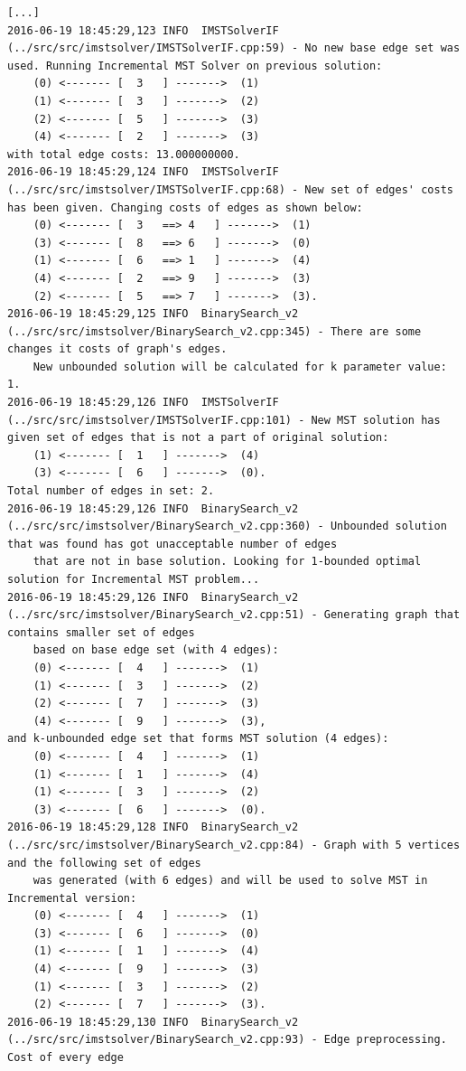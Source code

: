 \begin{verbatim}
[...]
2016-06-19 18:45:29,123 INFO  IMSTSolverIF (../src/src/imstsolver/IMSTSolverIF.cpp:59) - No new base edge set was used. Running Incremental MST Solver on previous solution:
	(0)	<------- [	3	] ------->	(1)
	(1)	<------- [	3	] ------->	(2)
	(2)	<------- [	5	] ------->	(3)
	(4)	<------- [	2	] ------->	(3)
with total edge costs: 13.000000000.
2016-06-19 18:45:29,124 INFO  IMSTSolverIF (../src/src/imstsolver/IMSTSolverIF.cpp:68) - New set of edges' costs has been given. Changing costs of edges as shown below:
	(0)	<------- [	3	==>	4	] ------->	(1)
	(3)	<------- [	8	==>	6	] ------->	(0)
	(1)	<------- [	6	==>	1	] ------->	(4)
	(4)	<------- [	2	==>	9	] ------->	(3)
	(2)	<------- [	5	==>	7	] ------->	(3).
2016-06-19 18:45:29,125 INFO  BinarySearch_v2 (../src/src/imstsolver/BinarySearch_v2.cpp:345) - There are some changes it costs of graph's edges. 
	New unbounded solution will be calculated for k parameter value: 1.
2016-06-19 18:45:29,126 INFO  IMSTSolverIF (../src/src/imstsolver/IMSTSolverIF.cpp:101) - New MST solution has given set of edges that is not a part of original solution:
	(1)	<------- [	1	] ------->	(4)
	(3)	<------- [	6	] ------->	(0).
Total number of edges in set: 2.
2016-06-19 18:45:29,126 INFO  BinarySearch_v2 (../src/src/imstsolver/BinarySearch_v2.cpp:360) - Unbounded solution that was found has got unacceptable number of edges 
	that are not in base solution. Looking for 1-bounded optimal solution for Incremental MST problem...
2016-06-19 18:45:29,126 INFO  BinarySearch_v2 (../src/src/imstsolver/BinarySearch_v2.cpp:51) - Generating graph that contains smaller set of edges 
	based on base edge set (with 4 edges):
	(0)	<------- [	4	] ------->	(1)
	(1)	<------- [	3	] ------->	(2)
	(2)	<------- [	7	] ------->	(3)
	(4)	<------- [	9	] ------->	(3),
and k-unbounded edge set that forms MST solution (4 edges):
	(0)	<------- [	4	] ------->	(1)
	(1)	<------- [	1	] ------->	(4)
	(1)	<------- [	3	] ------->	(2)
	(3)	<------- [	6	] ------->	(0).
2016-06-19 18:45:29,128 INFO  BinarySearch_v2 (../src/src/imstsolver/BinarySearch_v2.cpp:84) - Graph with 5 vertices and the following set of edges 
	was generated (with 6 edges) and will be used to solve MST in Incremental version:
	(0)	<------- [	4	] ------->	(1)
	(3)	<------- [	6	] ------->	(0)
	(1)	<------- [	1	] ------->	(4)
	(4)	<------- [	9	] ------->	(3)
	(1)	<------- [	3	] ------->	(2)
	(2)	<------- [	7	] ------->	(3).
2016-06-19 18:45:29,130 INFO  BinarySearch_v2 (../src/src/imstsolver/BinarySearch_v2.cpp:93) - Edge preprocessing. Cost of every edge 

\end{verbatim}
